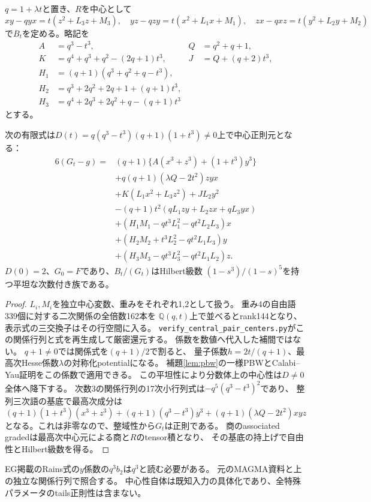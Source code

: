 $q=1+\lambda t$と置き、$R$を中心として
\[
 xy-qyx=t(z^2+L_3z+M_3),\quad
 yz-qzy=t(x^2+L_1x+M_1),\quad
 zx-qxz=t(y^2+L_2y+M_2)
\]
で$B_t$を定める。略記を
\begin{align*}
 A&=q^3-t^3,& Q&=q^2+q+1,\\
 K&=q^4+q^3+q^2-(2q+1)t^3,& J&=Q+(q+2)t^3,\\
 H_1&=(q+1)(q^3+q^2+q-t^3),\\
 H_2&=q^3+2q^2+2q+1+(q+1)t^3,\\
 H_3&=q^4+2q^3+2q^2+q-(q+1)t^3
\end{align*}
とする。
\begin{proposition}[可換点で正則なRains規格化]
\label{prop:pair-rains-polynomial}
次の有限式は$D(t)=q(q^3-t^3)(q+1)(1+t^3)\ne0$上で中心正則元となる：
\begin{align*}
 6(G_t-g)={}&(q+1)\{A(x^3+z^3)+(1+t^3)y^3\}\\
 &+q(q+1)(\lambda Q-2t^2)zyx\\
 &+K(L_1x^2+L_3z^2)+JL_2y^2\\
 &-(q+1)t^2(qL_1zy+L_2zx+qL_3yx)\\
 &+(H_1M_1-qt^3L_1^2-qt^2L_2L_3)x\\
 &+(H_2M_2+t^3L_2^2-qt^2L_1L_3)y\\
 &+(H_3M_3-qt^3L_3^2-qt^2L_1L_2)z.
\end{align*}
$D(0)=2$、$G_0=F$であり、$B_t/(G_t)$はHilbert級数
$(1-s^3)/(1-s)^5$を持つ平坦な次数付き族である。
\end{proposition}
\begin{proof}
$L_i,M_i$を独立中心変数、重みをそれぞれ1,2として扱う。
重み4の自由語339個に対する二次関係の全倍数162本を
$\mathbb Q(q,t)$上で並べるとrank144となり、表示式の三交換子はその行空間に入る。
\texttt{verify\_central\_pair\_centers.py}がこの関係行列と式を再生成して厳密還元する。
係数を数値へ代入した補間ではない。
$q+1\ne0$では関係式を$(q+1)/2$で割ると、
量子係数$h=2t/(q+1)$、最高次Hesse係数$\lambda$の対称化potentialになる。
補題\ref{lem:pbw}の一様PBWとCalabi--Yau証明をこの係数で適用できる。
この平坦性により分数体上の中心性は$D\ne0$全体へ降下する。
次数3の関係行列の17次小行列式は$-q^5(q^3-t^3)^2$であり、
整列三次語の基底で最高次成分は
\[
 (q+1)(1+t^3)(x^3+z^3)+(q+1)(q^3-t^3)y^3
 +(q+1)(\lambda Q-2t^2)xyz
\]
となる。これは非零なので、整域性から$G_t$は正則である。
商のassociated gradedは最高次中心元による商と$R$のtensor積となり、
その基底の持上げで自由性とHilbert級数を得る。
\end{proof}
\begin{remark}
EG掲載のRains式の$y$係数の$q^3b_2$は$q^3$と読む必要がある。
元のMAGMA資料\cite{RainsMagma}と上の独立な関係行列で照合する。
中心性自体は既知入力の具体化であり、全特殊パラメータのtails正則性は含まない。
\end{remark}

